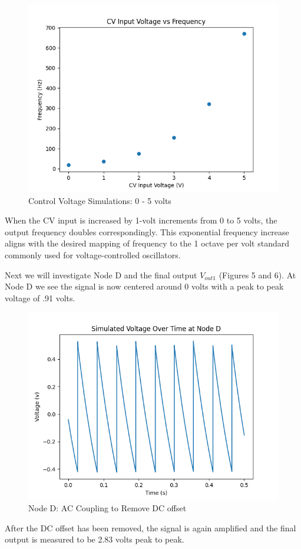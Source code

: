 \documentclass{article}
\begin{document}
\begin{figure}[H]
  \centering
  \includegraphics[width=.7\linewidth]{png/Figure_3.png}
  \caption{Control Voltage Simulations: 0 - 5 volts}
\end{figure}

When the CV input is increased by 1-volt increments from 0 to 5 volts, the output frequency doubles correspondingly. This exponential frequency increase aligns with the desired mapping of frequency to the 1 octave per volt standard commonly used for voltage-controlled oscillators.

Next we will investigate Node D and the final output $V_{out1}$ (Figures 5 and 6). At Node D we see the signal is now centered around 0 volts with a peak to peak voltage of .91 volts.

\begin{figure}[H]
  \centering
  \includegraphics[width=.7\linewidth]{png/nodeD.png}
  \caption{Node D: AC Coupling to Remove DC offset}
\end{figure}

After the DC offset has been removed, the signal is again amplified and the final output is measured to be 2.83 volts peak to peak.
\end{document}
